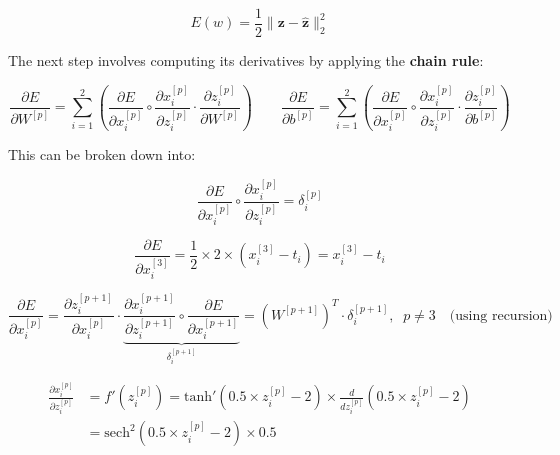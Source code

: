 \documentclass[12pt]{article}
\begin{document}
\begin{enumerate}[leftmargin=\labelsep]
          \vskip -0.3cm
          \begin{equation*}
              E(w) = \frac{1}{2} \|\mathbf{z} - \hat{\mathbf{z}}\|^{2}_{2}
          \end{equation*}

          The next step involves computing its derivatives by applying the \textbf{chain rule}:

          \begin{equation*}
            \frac{\partial E}{\partial W^{[p]}} = \sum_{i=1}^{2} \left(\frac{\partial E}{\partial x^{[p]}_i} \circ
              \frac{\partial x^{[p]}_i}{\partial z^{[p]}_i} \cdot \frac{\partial z^{[p]}_i}{\partial W^{[p]}} \right)
            \qquad
            \frac{\partial E}{\partial b^{[p]}} = \sum_{i=1}^{2} \left(\frac{\partial E}{\partial x^{[p]}_i} \circ
              \frac{\partial x^{[p]}_i}{\partial z^{[p]}_i} \cdot \frac{\partial z^{[p]}_i}{\partial b^{[p]}} \right)
          \end{equation*}

          This can be broken down into:

          \vskip -0.3cm
          \begin{equation*}
              \frac{\partial E}{\partial x^{[p]}_i} \circ \frac{\partial x^{[p]}_i}{\partial z^{[p]}_i} = \delta^{[p]}_i
          \end{equation*}

          \begin{equation*}
              \frac{\partial E}{\partial x^{[3]}_i} = \frac{1}{2} \times 2 \times \left(x^{[3]}_i - t_i\right)
              = x^{[3]}_i - t_i
          \end{equation*}

          \begin{equation*}
              \frac{\partial E}{\partial x^{[p]}_i} = \frac{\partial z^{[p+1]}_i}{\partial x^{[p]}_i} \cdot
              \underbrace{\frac{\partial x^{[p+1]}_i}{\partial z^{[p+1]}_i} \circ \frac{\partial E}{\partial x^{[p+1]}_i}}_{\delta^{[p+1]}_i}
              = \left(W^{[p+1]}\right)^{T} \cdot \delta^{[p+1]}_i, \;\; p \neq 3 \quad \text{(using recursion)}
          \end{equation*}

          \vskip -0.5cm
          \begin{align*}
              \frac{\partial x^{[p]}_i}{\partial z^{[p]}_i} & = f'\left(z^{[p]}_i\right) = \text{tanh}'\left(0.5 \times z^{[p]}_i - 2\right) \times
              \frac{d}{d z^{[p]}_i} \left(0.5 \times z^{[p]}_i - 2\right) \\
              & = \text{sech}^2\left(0.5 \times z^{[p]}_i - 2\right) \times 0.5
          \end{align*}


\end{enumerate}
\end{document}
